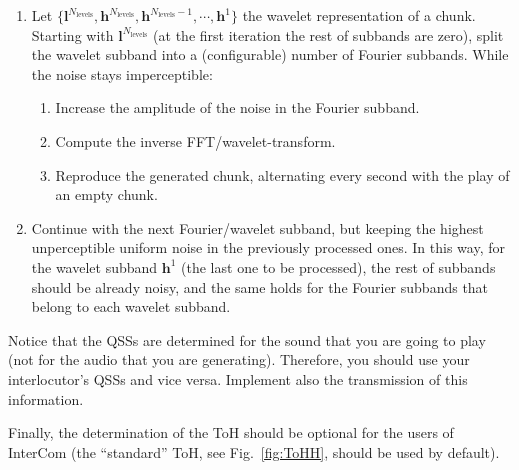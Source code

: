 \begin{enumerate}
\item Let
  $\{{\mathbf l}^{N_{\text{levels}}}, {\mathbf h}^{N_{\text{levels}}},
  {\mathbf h}^{N_{\text{levels}}-1},\cdots, {\mathbf h}^1\}$ the
  wavelet representation of a
  chunk. %
  Starting with ${\mathbf l}^{N_{\text{levels}}}$ (at the first
  iteration the rest of subbands are zero), split the wavelet subband
  into a (configurable) number of Fourier subbands. While the noise stays
  imperceptible:
  \begin{enumerate}
  \item Increase the amplitude of the noise in the Fourier subband.
  \item Compute the inverse FFT/wavelet-transform.
  \item Reproduce the generated chunk, alternating every second with
    the play of an empty chunk.
  \end{enumerate}
\item Continue with the next Fourier/wavelet subband, but keeping the
  highest unperceptible uniform noise in the previously processed
  ones. In this way, for the wavelet subband ${\mathbf h}^1$ (the last
  one to be processed), the rest of subbands should be already
  noisy, and the same holds for the Fourier subbands that
  belong to each wavelet subband.
\end{enumerate}

Notice that the QSSs are determined for the sound that you are going
to play (not for the audio that you are generating). Therefore, you
should use your interlocutor's QSSs and vice versa. Implement also the
transmission of this information.

Finally, the determination of the ToH should be optional for the users of
InterCom (the ``standard'' ToH, see Fig.~\ref{fig:ToHH}, should be
used by default).




